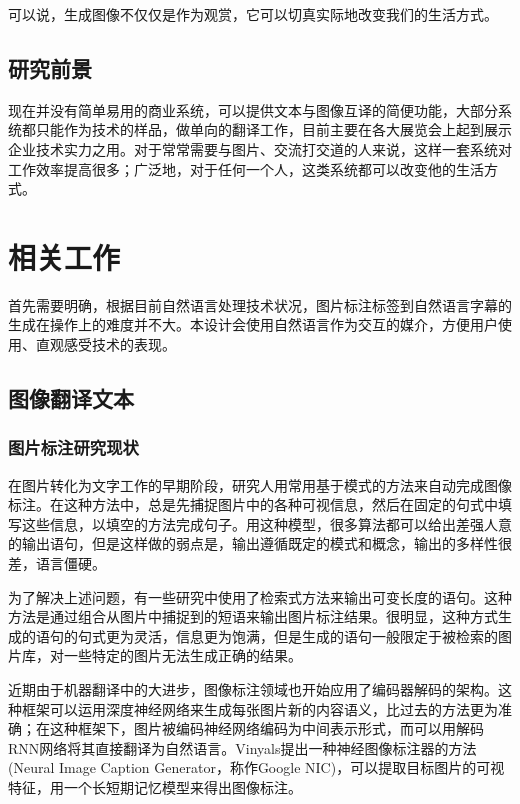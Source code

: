 可以说，生成图像不仅仅是作为观赏，它可以切真实际地改变我们的生活方式。

\subsection{研究前景}
现在并没有简单易用的商业系统，可以提供文本与图像互译的简便功能，大部分系统都只能作为技术的样品，做单向的翻译工作，目前主要在各大展览会上起到展示企业技术实力之用。对于常常需要与图片、交流打交道的人来说，这样一套系统对工作效率提高很多；广泛地，对于任何一个人，这类系统都可以改变他的生活方式。

\section{相关工作}
首先需要明确，根据目前自然语言处理技术状况，图片标注标签到自然语言字幕的生成在操作上的难度并不大。本设计会使用自然语言作为交互的媒介，方便用户使用、直观感受技术的表现。

\subsection{图像翻译文本}
\subsubsection{图片标注研究现状}
在图片转化为文字工作的早期阶段，研究人用常用基于模式的方法来自动完成图像标注。在这种方法中，总是先捕捉图片中的各种可视信息，然后在固定的句式中填写这些信息，以填空的方法完成句子。用这种模型，很多算法都可以给出差强人意的输出语句，但是这样做的弱点是，输出遵循既定的模式和概念，输出的多样性很差，语言僵硬。

为了解决上述问题，有一些研究中使用了检索式方法来输出可变长度的语句。这种方法是通过组合从图片中捕捉到的短语来输出图片标注结果。很明显，这种方式生成的语句的句式更为灵活，信息更为饱满，但是生成的语句一般限定于被检索的图片库，对一些特定的图片无法生成正确的结果。

近期由于机器翻译中的大进步，图像标注领域也开始应用了编码器解码的架构。这种框架可以运用深度神经网络来生成每张图片新的内容语义，比过去的方法更为准确；在这种框架下，图片被编码神经网络编码为中间表示形式，而可以用解码RNN网络将其直接翻译为自然语言。Vinyals提出一种神经图像标注器的方法(Neural Image Caption Generator，称作Google NIC)，可以提取目标图片的可视特征，用一个长短期记忆模型来得出图像标注。

